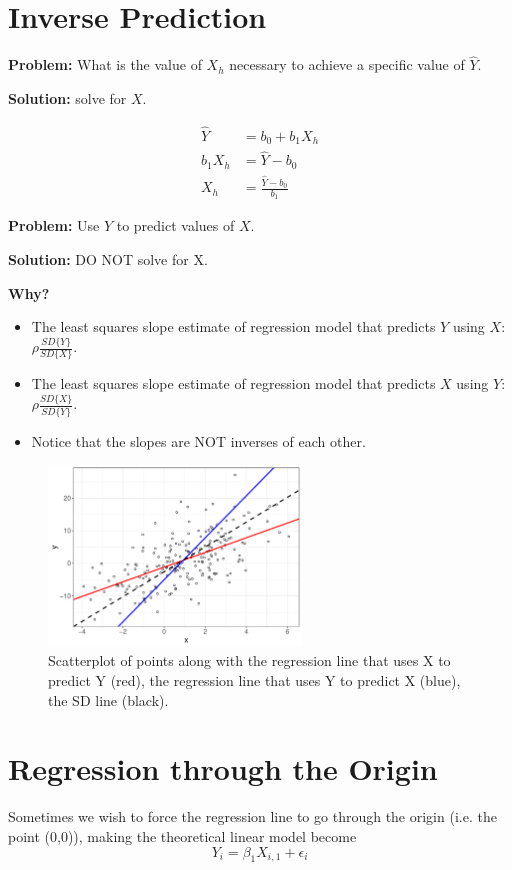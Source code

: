 \documentclass[12pt]{notes}
\begin{document}
\section{Inverse Prediction}
\textbf{Problem:} What is the value of $X_h$ necessary to achieve a specific value of $\hat{Y}.$ 

\nspace
\textbf{Solution:} solve for $X$.

\begin{align*}
\hat{Y} &= b_0 + b_1X_h \\
b_1X_h &= \hat{Y} - b_0 \\
X_h &= \frac{\hat{Y} - b_0}{b_1}
\end{align*}

\nspace \textbf{Problem:} Use $Y$ to predict values of $X$. 

\nspace \textbf{Solution:} DO NOT solve for X. 

\nspace \textbf{Why?}

\begin{itemize}
\item The least squares slope estimate of regression model that predicts $Y$ using $X$: $\rho\frac{SD\{Y\}}{SD\{X\}}$.
\item The least squares slope estimate of regression model that predicts $X$ using $Y$: $\rho\frac{SD\{X\}}{SD\{Y\}}$.
\item Notice that the slopes are NOT inverses of each other. 
\end{itemize} 

\begin{figure}[H]
\centering
\includegraphics[width=0.6\textwidth]{figures/module2/sdline.pdf}
\caption{Scatterplot of points along with the regression line that uses X to predict Y (red), the regression line that uses Y to predict X (blue), the SD line (black). }
\end{figure}

\section{Regression through the Origin}
Sometimes we wish to force the regression line to go through the origin (i.e. the point (0,0)), making the theoretical linear model become
\[
Y_i = \beta_1X_{i, 1} + \epsilon_i
\]
\end{document}
